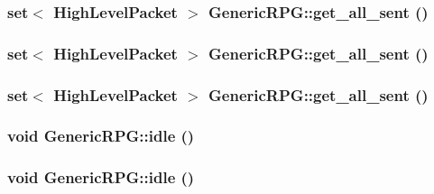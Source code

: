 \hypertarget{classGenericRPG_7f855d4d69dc3f019dffdf63d29e2bf4}{
\subsubsection[{get\_\-all\_\-sent}]{\setlength{\rightskip}{0pt plus 5cm}set$<$ {\bf HighLevelPacket} $>$ GenericRPG::get\_\-all\_\-sent ()}}
\label{classGenericRPG_7f855d4d69dc3f019dffdf63d29e2bf4}


\hypertarget{classGenericRPG_7f855d4d69dc3f019dffdf63d29e2bf4}{
\subsubsection[{get\_\-all\_\-sent}]{\setlength{\rightskip}{0pt plus 5cm}set$<$ {\bf HighLevelPacket} $>$ GenericRPG::get\_\-all\_\-sent ()}}
\label{classGenericRPG_7f855d4d69dc3f019dffdf63d29e2bf4}


\hypertarget{classGenericRPG_7f855d4d69dc3f019dffdf63d29e2bf4}{
\subsubsection[{get\_\-all\_\-sent}]{\setlength{\rightskip}{0pt plus 5cm}set$<$ {\bf HighLevelPacket} $>$ GenericRPG::get\_\-all\_\-sent ()}}
\label{classGenericRPG_7f855d4d69dc3f019dffdf63d29e2bf4}


\hypertarget{classGenericRPG_661b35dacbf7bae62164df5fc1b73477}{
\subsubsection[{idle}]{\setlength{\rightskip}{0pt plus 5cm}void GenericRPG::idle ()}}
\label{classGenericRPG_661b35dacbf7bae62164df5fc1b73477}


\hypertarget{classGenericRPG_661b35dacbf7bae62164df5fc1b73477}{
\subsubsection[{idle}]{\setlength{\rightskip}{0pt plus 5cm}void GenericRPG::idle ()}}
\label{classGenericRPG_661b35dacbf7bae62164df5fc1b73477}


